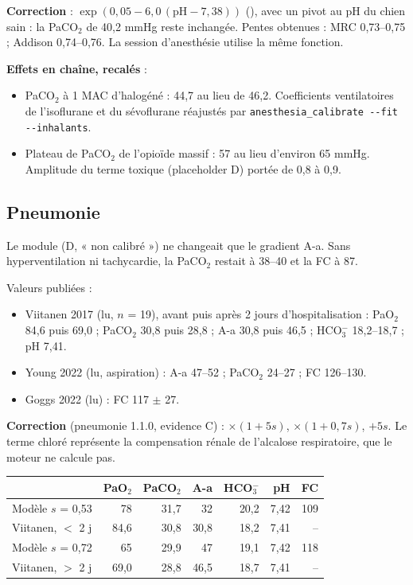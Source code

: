 \documentclass[10pt,a4paper]{article}
\newcommand{\vp}[1]{\path{#1}}
\begin{document}
\textbf{Correction} : $\exp(0{,}05 - 6{,}0\,(\mathrm{pH}-7{,}38))$ (\vp{gas::PH_GAIN}), avec un pivot au pH du chien sain : la PaCO$_2$ de 40,2 mmHg reste inchangée. Pentes obtenues : MRC 0,73–0,75 ; Addison 0,74–0,76. La session d'anesthésie utilise la même fonction.

\textbf{Effets en chaîne, recalés} :
\begin{itemize}
\item PaCO$_2$ à 1 MAC d'halogéné : 44,7 au lieu de 46,2. Coefficients ventilatoires de l'isoflurane et du sévoflurane réajustés par \texttt{anesthesia\_calibrate -{}-fit -{}-inhalants}.
\item Plateau de PaCO$_2$ de l'opioïde massif : 57 au lieu d'environ 65 mmHg. Amplitude du terme toxique (placeholder D) portée de 0,8 à 0,9.
\end{itemize}

\subsection{Pneumonie}
Le module (D, « non calibré ») ne changeait que le gradient A-a. Sans hyperventilation ni tachycardie, la PaCO$_2$ restait à 38–40 et la FC à 87.

Valeurs publiées :
\begin{itemize}
\item Viitanen 2017 (lu, $n$ = 19), avant puis après 2 jours d'hospitalisation : PaO$_2$ 84,6 puis 69,0 ; PaCO$_2$ 30,8 puis 28,8 ; A-a 30,8 puis 46,5 ; HCO$_3^-$ 18,2–18,7 ; pH 7,41.
\item Young 2022 (lu, aspiration) : A-a 47–52 ; PaCO$_2$ 24–27 ; FC 126–130.
\item Goggs 2022 (lu) : FC 117 $\pm$ 27.
\end{itemize}

\textbf{Correction} (pneumonie 1.1.0, evidence C) : \vp{vent_drive} $\times(1+5s)$, \vp{hr} $\times(1+0{,}7s)$, \vp{cl} $+5s$. Le terme chloré représente la compensation rénale de l'alcalose respiratoire, que le moteur ne calcule pas.

\begin{center}\small
\begin{tabular}{lrrrrrr}
\toprule
& PaO$_2$ & PaCO$_2$ & A-a & HCO$_3^-$ & pH & FC\\
\midrule
Modèle $s$ = 0,53 & 78 & 31,7 & 32 & 20,2 & 7,42 & 109\\
Viitanen, $<$ 2 j & 84,6 & 30,8 & 30,8 & 18,2 & 7,41 & --\\
Modèle $s$ = 0,72 & 65 & 29,9 & 47 & 19,1 & 7,42 & 118\\
Viitanen, $>$ 2 j & 69,0 & 28,8 & 46,5 & 18,7 & 7,41 & --\\
\bottomrule
\end{tabular}
\end{center}
\end{document}
